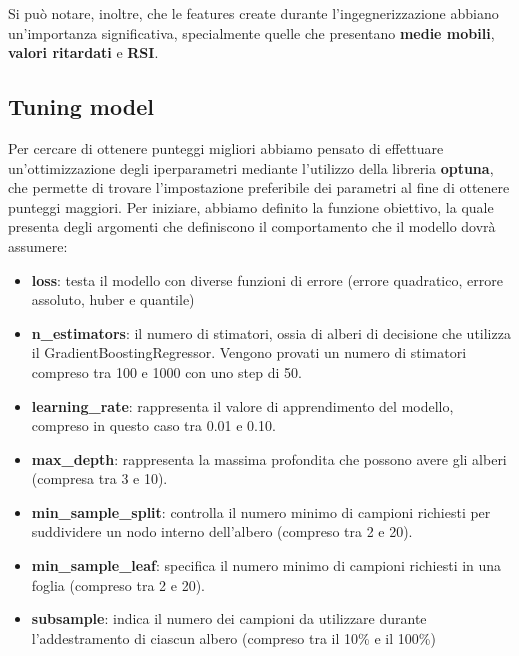 \documentclass{article}
\begin{document}
Si può notare, inoltre, che le features create durante l'ingegnerizzazione abbiano un'importanza significativa, specialmente quelle che presentano \textbf{medie mobili}, \textbf{valori ritardati} e \textbf{RSI}. 
\newpage
\subsection{Tuning model}
Per cercare di ottenere punteggi migliori abbiamo pensato di effettuare un'ottimizzazione degli iperparametri mediante l'utilizzo della libreria \textbf{optuna}, che permette di trovare l'impostazione preferibile  dei parametri al fine di ottenere punteggi maggiori. Per iniziare, abbiamo definito la funzione obiettivo, la quale presenta degli argomenti che definiscono il comportamento che il modello dovrà assumere:
\begin{itemize}
    \item \textbf{loss}: testa il modello con diverse funzioni di errore (errore quadratico, errore assoluto, huber e quantile)
    \item \textbf{n\_estimators}: il numero di stimatori, ossia di alberi di decisione che utilizza il GradientBoostingRegressor. Vengono provati un numero di stimatori compreso tra 100 e 1000 con uno step di 50.
    \item \textbf{learning\_rate}: rappresenta il valore di apprendimento del modello, compreso in questo caso tra 0.01 e 0.10.
    \item \textbf{max\_depth}: rappresenta la massima profondita che possono avere gli alberi (compresa tra 3 e 10).
    \item \textbf{min\_sample\_split}: controlla il numero minimo di campioni richiesti per suddividere un nodo interno dell'albero (compreso tra 2 e 20).
    \item \textbf{min\_sample\_leaf}: specifica il numero minimo di campioni richiesti in una foglia (compreso tra 2 e 20).
    \item \textbf{subsample}: indica il numero dei campioni da utilizzare durante l'addestramento di ciascun albero (compreso tra il 10\% e il 100\%)
\end{itemize}
\end{document}
